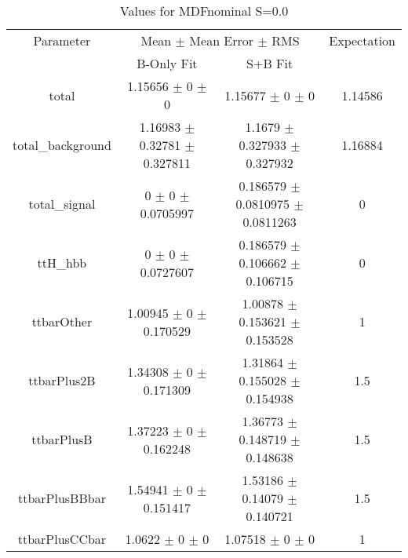 \begin{table}
\centering
\caption{Values for MDFnominal S=0.0}
\begin{tabular}{cccc}
\toprule
Parameter & \multicolumn{2}{c}{Mean $\pm$ Mean Error $\pm$ RMS} & Expectation\\
 & B-Only Fit & S+B Fit & \\
\midrule
total & \num{1.15656} $\pm$ \num{0} $\pm$ \num{0} & \num{1.15677} $\pm$ \num{0} $\pm$ \num{0} & \num{1.14586}\\
total\_background & \num{1.16983} $\pm$ \num{0.32781} $\pm$ \num{0.327811} & \num{1.1679} $\pm$ \num{0.327933} $\pm$ \num{0.327932} & \num{1.16884}\\
total\_signal & \num{0} $\pm$ \num{0} $\pm$ \num{0.0705997} & \num{0.186579} $\pm$ \num{0.0810975} $\pm$ \num{0.0811263} & \num{0}\\
ttH\_hbb & \num{0} $\pm$ \num{0} $\pm$ \num{0.0727607} & \num{0.186579} $\pm$ \num{0.106662} $\pm$ \num{0.106715} & \num{0}\\
ttbarOther & \num{1.00945} $\pm$ \num{0} $\pm$ \num{0.170529} & \num{1.00878} $\pm$ \num{0.153621} $\pm$ \num{0.153528} & \num{1}\\
ttbarPlus2B & \num{1.34308} $\pm$ \num{0} $\pm$ \num{0.171309} & \num{1.31864} $\pm$ \num{0.155028} $\pm$ \num{0.154938} & \num{1.5}\\
ttbarPlusB & \num{1.37223} $\pm$ \num{0} $\pm$ \num{0.162248} & \num{1.36773} $\pm$ \num{0.148719} $\pm$ \num{0.148638} & \num{1.5}\\
ttbarPlusBBbar & \num{1.54941} $\pm$ \num{0} $\pm$ \num{0.151417} & \num{1.53186} $\pm$ \num{0.14079} $\pm$ \num{0.140721} & \num{1.5}\\
ttbarPlusCCbar & \num{1.0622} $\pm$ \num{0} $\pm$ \num{0} & \num{1.07518} $\pm$ \num{0} $\pm$ \num{0} & \num{1}\\
\bottomrule
\end{tabular}
\end{table}